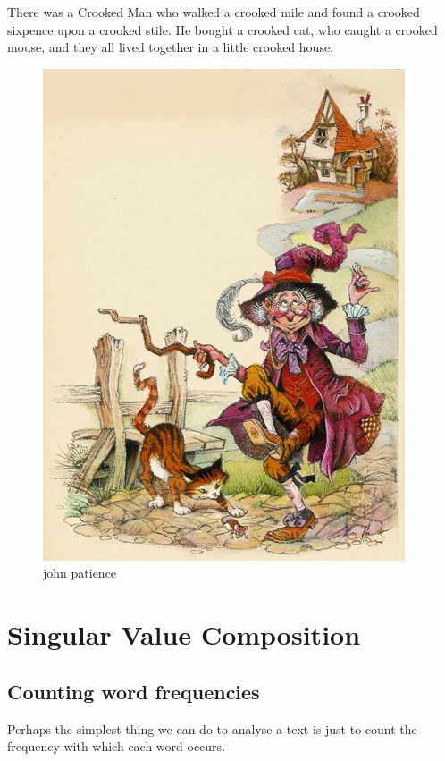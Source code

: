 \documentclass[11pt]{article}
\begin{document}
There was a Crooked Man who walked a crooked mile and found a crooked sixpence
upon a crooked stile.
He bought a crooked cat, who caught a crooked mouse, and they all lived
together in a little crooked house.

\begin{figure}[H]
    \centering
    \includegraphics{../out/images/john_patience}
    \caption[john patience]{john patience}
    \label{fig:john patience}
\end{figure}

\section{Singular Value Composition}\label{sec:singular-value-composition}
\subsection{Counting word frequencies}\label{subsec:counting-word-frequencies}
Perhaps the simplest thing we can do to analyse a text is just to count the
frequency with which each word occurs.
\end{document}
